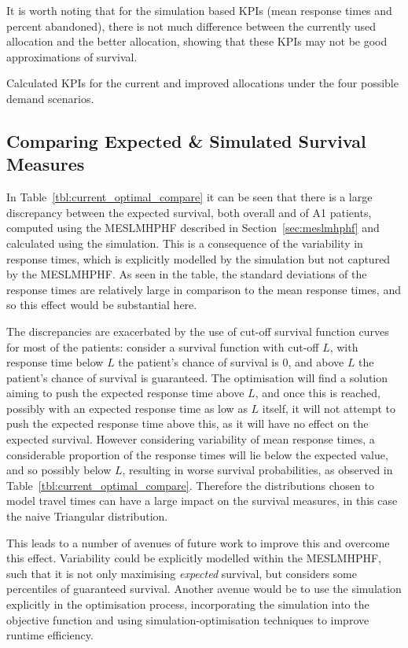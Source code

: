 \documentclass[numbers,webpdf,imaman]{ima-authoring-template}%
\begin{document}
It is worth noting that for the simulation based KPIs (mean response times and
percent abandoned), there is not much
difference between the currently used allocation and the better allocation,
showing that these KPIs may not be good approximations of survival.

\begin{table}
\resizebox{\textwidth}{!}{%
%
}
\caption{Calculated KPIs for the current and improved allocations under the
four possible demand scenarios.}
\label{tbl:current_optimal_compare}
\end{table}

\subsection{Comparing Expected \& Simulated Survival Measures}\label{sec:compare_exp_and_sim}
In Table~\ref{tbl:current_optimal_compare} it can be seen that there is a large
discrepancy between the expected survival, both overall and of A1 patients,
computed using the MESLMHPHF described in Section~\ref{sec:meslmhphf} and
calculated using the simulation. This is a consequence of the variability in
response times, which is explicitly modelled by the simulation but not captured
by the MESLMHPHF. As seen in the table, the standard deviations of the response
times are relatively large in comparison to the mean response times, and so this
effect would be substantial here.

The discrepancies are exacerbated by the use of cut-off survival function curves
for most of the patients: consider a survival function with cut-off $L$, with
response time below $L$ the patient's chance of survival is 0, and above $L$ the
patient's chance of survival is guaranteed. The optimisation will find a
solution aiming to push the expected response time above $L$, and once this is
reached, possibly with an expected response time as low as $L$ itself, it will
not attempt to push the expected
response time above this, as it will have no effect on the expected survival.
However considering variability of mean response times, a considerable
proportion of the response times will lie below the expected value, and so
possibly below $L$, resulting in worse survival probabilities, as observed in
Table~\ref{tbl:current_optimal_compare}. Therefore the distributions chosen to
model travel times can have a large impact on the survival measures, in this
case the naive Triangular distribution.

This leads to a number of avenues of future work to improve this and overcome
this effect. Variability could be explicitly modelled within the MESLMHPHF, such
that it is not only maximising \textit{expected} survival, but considers some
percentiles of guaranteed survival. Another avenue would be to use the
simulation explicitly in the optimisation process, incorporating the simulation
into the objective function and using simulation-optimisation techniques to
improve runtime efficiency.
\end{document}
